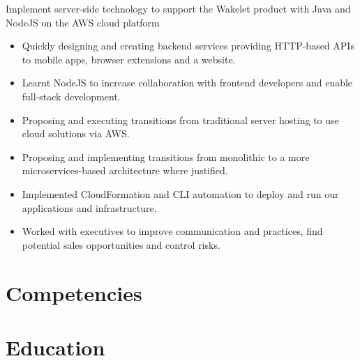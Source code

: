 \documentclass[11pt,a4paper,sans]{moderncv}        %
\begin{document}
{Implement server-side technology to support the Wakelet product with Java and NodeJS on the AWS cloud platform
\newline{}
\begin{itemize}
\item Quickly designing and creating backend services providing HTTP-based APIs to mobile apps, browser extensions and a website.
\item Learnt NodeJS to increase collaboration with frontend developers and enable full-stack development.
\item Proposing and executing transitions from traditional server hosting to use cloud solutions via AWS.
\item Proposing and implementing transitions from monolithic to a more microservices-based architecture where justified.
\item Implemented CloudFormation and CLI automation to deploy and run our applications and infrastructure.
\item Worked with executives to improve communication and practices, find potential sales opportunities and control risks.
\end{itemize}
}


\section{Competencies}


\section{Education}

\end{document}

